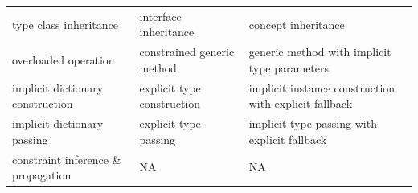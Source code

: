 \begin{longtable}[]{@{}lll@{}}
\begin{minipage}[t]{0.14\columnwidth}\raggedright\strut
type class inheritance\strut
\end{minipage} & \begin{minipage}[t]{0.11\columnwidth}\raggedright\strut
interface inheritance\strut
\end{minipage} & \begin{minipage}[t]{0.11\columnwidth}\raggedright\strut
concept inheritance\strut
\end{minipage}\tabularnewline
\begin{minipage}[t]{0.14\columnwidth}\raggedright\strut
overloaded operation\strut
\end{minipage} & \begin{minipage}[t]{0.11\columnwidth}\raggedright\strut
constrained generic method\strut
\end{minipage} & \begin{minipage}[t]{0.11\columnwidth}\raggedright\strut
generic method with implicit type parameters\strut
\end{minipage}\tabularnewline
\begin{minipage}[t]{0.14\columnwidth}\raggedright\strut
implicit dictionary construction\strut
\end{minipage} & \begin{minipage}[t]{0.11\columnwidth}\raggedright\strut
explicit type construction\strut
\end{minipage} & \begin{minipage}[t]{0.11\columnwidth}\raggedright\strut
implicit instance construction with explicit fallback\strut
\end{minipage}\tabularnewline
\begin{minipage}[t]{0.14\columnwidth}\raggedright\strut
implicit dictionary passing\strut
\end{minipage} & \begin{minipage}[t]{0.11\columnwidth}\raggedright\strut
explicit type passing\strut
\end{minipage} & \begin{minipage}[t]{0.11\columnwidth}\raggedright\strut
implicit type passing with explicit fallback\strut
\end{minipage}\tabularnewline
\begin{minipage}[t]{0.14\columnwidth}\raggedright\strut
constraint inference \& propagation\strut
\end{minipage} & \begin{minipage}[t]{0.11\columnwidth}\raggedright\strut
NA\strut
\end{minipage} & \begin{minipage}[t]{0.11\columnwidth}\raggedright\strut
NA\strut
\end{minipage}\tabularnewline
\bottomrule
\end{longtable}

